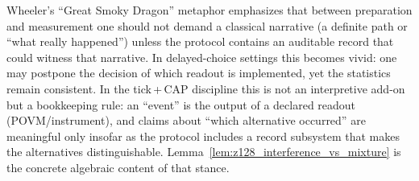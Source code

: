 Wheeler's ``Great Smoky Dragon'' metaphor emphasizes that between preparation and measurement one should not demand a classical narrative (a definite path or ``what really happened'') unless the protocol contains an auditable record that could witness that narrative.
In delayed-choice settings this becomes vivid: one may postpone the decision of which readout is implemented, yet the statistics remain consistent.
In the tick\,+\,CAP discipline this is not an interpretive add-on but a bookkeeping rule:
an ``event'' is the output of a declared readout (POVM/instrument), and claims about ``which alternative occurred'' are meaningful only insofar as the protocol includes a record subsystem that makes the alternatives distinguishable.
Lemma~\ref{lem:z128_interference_vs_mixture} is the concrete algebraic content of that stance.


